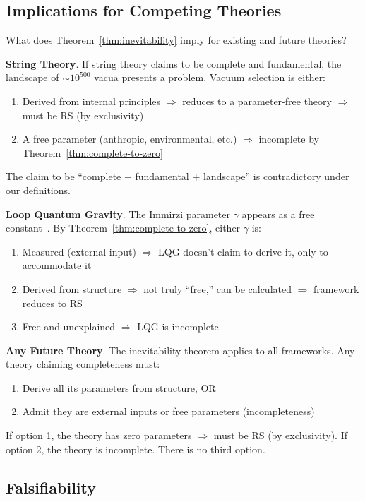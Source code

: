 \documentclass[12pt]{article}
\theoremstyle{remark}
\begin{document}
\subsection{Implications for Competing Theories}

What does Theorem~\ref{thm:inevitability} imply for existing and future theories?

\textbf{String Theory}. If string theory claims to be complete and fundamental, the landscape of $\sim 10^{500}$ vacua presents a problem. Vacuum selection is either:
\begin{enumerate}
\item Derived from internal principles $\Rightarrow$ reduces to a parameter-free theory $\Rightarrow$ must be RS (by exclusivity)
\item A free parameter (anthropic, environmental, etc.) $\Rightarrow$ incomplete by Theorem~\ref{thm:complete-to-zero}
\end{enumerate}
The claim to be ``complete + fundamental + landscape'' is contradictory under our definitions.

\textbf{Loop Quantum Gravity}. The Immirzi parameter $\gamma$ appears as a free constant~\cite{Rovelli2004}. By Theorem~\ref{thm:complete-to-zero}, either $\gamma$ is:
\begin{enumerate}
\item Measured (external input) $\Rightarrow$ LQG doesn't claim to derive it, only to accommodate it
\item Derived from structure $\Rightarrow$ not truly ``free,'' can be calculated $\Rightarrow$ framework reduces to RS
\item Free and unexplained $\Rightarrow$ LQG is incomplete
\end{enumerate}

\textbf{Any Future Theory}. The inevitability theorem applies to all frameworks. Any theory claiming completeness must:
\begin{enumerate}
\item Derive all its parameters from structure, OR
\item Admit they are external inputs or free parameters (incompleteness)
\end{enumerate}
If option 1, the theory has zero parameters $\Rightarrow$ must be RS (by exclusivity). If option 2, the theory is incomplete. There is no third option.

\subsection{Falsifiability}
\end{document}

